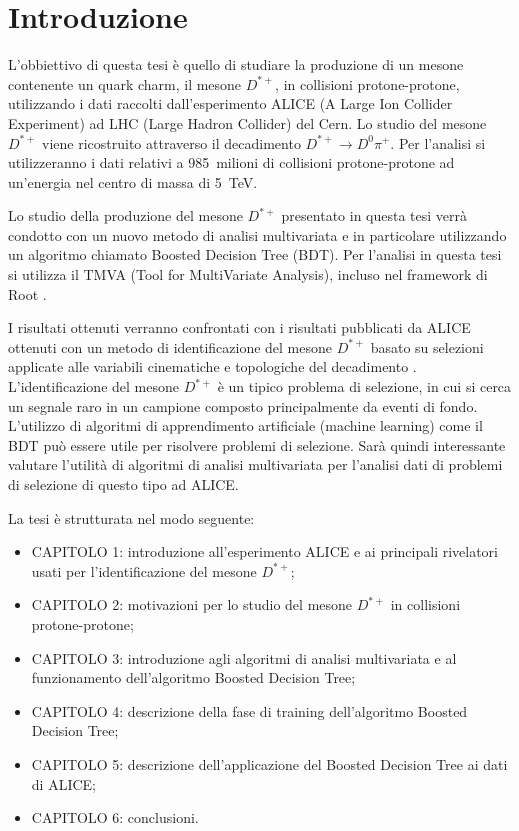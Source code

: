 \chapter*{Introduzione}
L'obbiettivo di questa tesi è quello di studiare la produzione di un mesone contenente un quark charm, il mesone $D^{*+}$,  in collisioni protone-protone, utilizzando i dati raccolti dall'esperimento ALICE (A Large Ion Collider Experiment) ad LHC (Large Hadron Collider) del Cern. Lo studio del mesone $D^{*+}$ viene ricostruito attraverso il decadimento $D^{*+} \rightarrow D^0 \pi^+$. Per l'analisi si utilizzeranno i dati relativi a 985~milioni di collisioni protone-protone ad un'energia nel centro di massa di 5~TeV.

Lo studio della produzione del mesone $D^{*+}$ presentato in questa tesi verrà condotto con un nuovo metodo di analisi multivariata e in particolare utilizzando un algoritmo chiamato Boosted Decision Tree (BDT). Per l'analisi in questa tesi si utilizza il TMVA \cite{TMVA} (Tool for MultiVariate Analysis), incluso nel framework di Root \cite{Root}. 

I risultati ottenuti verranno confrontati con i risultati pubblicati da ALICE ottenuti con un metodo di identificazione del mesone $D^{*+}$  basato su selezioni applicate alle variabili cinematiche e topologiche del decadimento \cite{dati_ALICE}. 
L'identificazione del mesone $D^{*+}$ è un tipico problema di selezione, in cui si cerca un segnale raro in un campione composto principalmente da eventi di fondo. L'utilizzo di algoritmi di apprendimento artificiale (machine learning) come il BDT può essere utile per risolvere problemi di selezione. Sar\`a quindi interessante valutare l'utilità di algoritmi di analisi multivariata per l'analisi dati di problemi di selezione di questo tipo ad ALICE.

La tesi \`e strutturata nel modo seguente:
    \begin{itemize}
        \item CAPITOLO 1: introduzione all'esperimento ALICE e ai principali rivelatori usati per l'identificazione del mesone $D^{*+}$;
        \item CAPITOLO 2: motivazioni per lo studio del mesone $D^{*+}$ in collisioni protone-protone;
        \item CAPITOLO 3: introduzione agli algoritmi di analisi multivariata e al funzionamento dell'algoritmo Boosted Decision Tree;
        \item CAPITOLO 4: descrizione della fase di training dell'algoritmo Boosted Decision Tree;
        \item CAPITOLO 5: descrizione dell'applicazione del Boosted Decision Tree ai dati di ALICE;
        \item CAPITOLO 6: conclusioni.
    \end{itemize}
